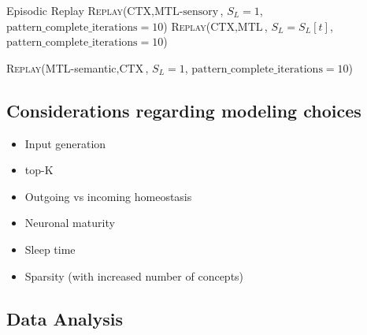 \documentclass{article}
\begin{document}
\begin{algorithm}[h!]
\caption{Sleep}\label{alg:sleep}
\begin{algorithmic}[1]
\State Episodic Replay
            \State \textsc{Replay}(\textrm{CTX}$, \textrm{MTL-sensory}$, $S_L= 1$, $\textrm{pattern\_complete\_iterations}=10$)
        \Else
            \State \textsc{Replay}(\textrm{CTX}$, \textrm{MTL}$, $S_L= S_L[t]$, $\textrm{pattern\_complete\_iterations}=10$)
        \EndIf
    \EndFor

            \State \textsc{Replay}(\textrm{MTL-semantic}$, \textrm{CTX}$, $S_L= 1$, $\textrm{pattern\_complete\_iterations}=10$)
        \EndFor
    \EndIf
\EndFunction
\end{algorithmic}
\end{algorithm}
\subsection*{Considerations regarding modeling choices}
\begin{itemize}
    \item Input generation
    \item top-K
    \item Outgoing vs incoming homeostasis
    \item Neuronal maturity
    \item Sleep time
    \item Sparsity (with increased number of concepts)
\end{itemize}
\clearpage
\subsection*{Data Analysis}
\end{document}
